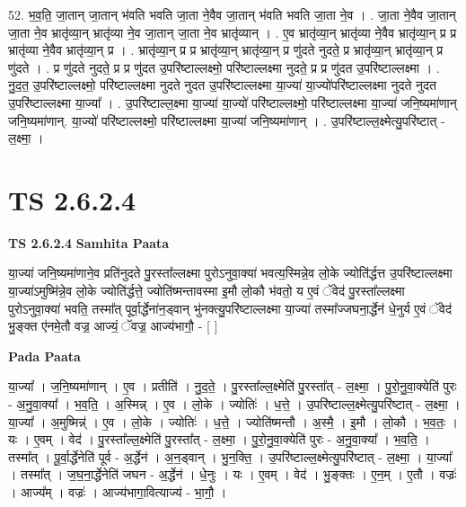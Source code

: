 \documentclass[17pt]{extarticle}
\begin{document}
52. भ॒व॒ति॒ जा॒तान् जा॒तान् भ॑वति भवति जा॒ता ने॒वैव जा॒तान् भ॑वति भवति जा॒ता ने॒व । . जा॒ता ने॒वैव जा॒तान् जा॒ता ने॒व भ्रातृ॑व्या॒न् भ्रातृ॑व्या ने॒व जा॒तान् जा॒ता ने॒व भ्रातृ॑व्यान् । . ए॒व भ्रातृ॑व्या॒न् भ्रातृ॑व्या ने॒वैव भ्रातृ॑व्या॒न् प्र प्र भ्रातृ॑व्या ने॒वैव भ्रातृ॑व्या॒न् प्र । . भ्रातृ॑व्या॒न् प्र प्र भ्रातृ॑व्या॒न् भ्रातृ॑व्या॒न् प्र णु॑दते नुदते॒ प्र भ्रातृ॑व्या॒न् भ्रातृ॑व्या॒न् प्र णु॑दते । . प्र णु॑दते नुदते॒ प्र प्र णु॑दत उ॒परि॑ष्टाल्लक्ष्मो॒ परि॑ष्टाल्लक्ष्मा नुदते॒ प्र प्र णु॑दत उ॒परि॑ष्टाल्लक्ष्मा । . नु॒द॒त॒ उ॒परि॑ष्टाल्लक्ष्मो॒ परि॑ष्टाल्लक्ष्मा नुदते नुदत उ॒परि॑ष्टाल्लक्ष्मा या॒ज्या॑ या॒ज्यो॑परि॑ष्टाल्लक्ष्मा नुदते नुदत उ॒परि॑ष्टाल्लक्ष्मा या॒ज्या᳚ । . उ॒परि॑ष्टाल्ल॒क्ष्मा या॒ज्या॑ या॒ज्यो॑ परि॑ष्टाल्लक्ष्मो॒ परि॑ष्टाल्लक्ष्मा या॒ज्या॑ जनि॒ष्यमा॑णान् जनि॒ष्यमा॑णान्. या॒ज्यो॑ परि॑ष्टाल्लक्ष्मो॒ परि॑ष्टाल्लक्ष्मा या॒ज्या॑ जनि॒ष्यमा॑णान् । . उ॒परि॑ष्टाल्ल॒क्ष्मेत्यु॒परि॑ष्टात् - ल॒क्ष्मा॒ । \newline
\pagebreak
{}

\section{ TS 2.6.2.4 }

\textbf{TS 2.6.2.4 } \newline
\textbf{Samhita Paata} \newline

या॒ज्या॑ जनि॒ष्यमा॑णाने॒व प्रति॑नुदते पु॒रस्ता᳚ल्लक्ष्मा पुरोऽनुवा॒क्या॑ भवत्य॒स्मिन्ने॒व लो॒के ज्योति॑र्द्धत्त उ॒परि॑ष्टाल्लक्ष्मा या॒ज्या॑ऽमुष्मि॑न्ने॒व लो॒के ज्योति॑र्द्धत्ते॒ ज्योति॑ष्मन्तावस्मा इ॒मौ लो॒कौ भ॑वतो॒ य ए॒वं ॅवेद॑ पु॒रस्ता᳚ल्लक्ष्मा पुरोऽनुवा॒क्या॑ भवति॒ तस्मा᳚त् पूर्वा॒र्द्धेना॑न॒ड्वान् भु॑नक्त्यु॒परि॑ष्टाल्लक्ष्मा या॒ज्या॑ तस्मा᳚ज्जघना॒र्द्धेन॑ धे॒नुर्य ए॒वं ॅवेद॑ भु॒ङ्क्त ए॑नमे॒तौ वज्र॒ आज्यं॒ ॅवज्र॒ आज्य॑भागौ॒ - [  ] \newline

\textbf{Pada Paata} \newline

या॒ज्या᳚ । ज॒नि॒ष्यमा॑णान् । ए॒व । प्रतीति॑ । नु॒द॒ते॒ । पु॒रस्ता᳚ल्ल॒क्ष्मेति॑ पु॒रस्ता᳚त् - ल॒क्ष्मा॒ । पु॒रो॒नु॒वा॒क्येति॑ पुरः - अ॒नु॒वा॒क्या᳚ । भ॒व॒ति॒ । अ॒स्मिन्न् । ए॒व । लो॒के । ज्योतिः॑ । ध॒त्ते॒ । उ॒परि॑ष्टाल्ल॒क्ष्मेत्यु॒परि॑ष्टात् - ल॒क्ष्मा॒ । या॒ज्या᳚ । अ॒मुष्मिन्न्॑ । ए॒व । लो॒के । ज्योतिः॑ । ध॒त्ते॒ । ज्योति॑ष्मन्तौ । अ॒स्मै॒ । इ॒मौ । लो॒कौ । भ॒व॒तः॒ । यः । ए॒वम् । वेद॑ । पु॒रस्ता᳚ल्ल॒क्ष्मेति॑ पु॒रस्ता᳚त् - ल॒क्ष्मा॒ । पु॒रो॒नु॒वा॒क्येति॑ पुरः - अ॒नु॒वा॒क्या᳚ । भ॒व॒ति॒ । तस्मा᳚त् । पू॒र्वा॒र्द्धेनेति॑ पूर्व - अ॒र्द्धेन॑ । अ॒न॒ड्वान् । भु॒न॒क्ति॒ । उ॒परि॑ष्टाल्ल॒क्ष्मेत्यु॒परि॑ष्टात् - ल॒क्ष्मा॒ । या॒ज्या᳚ । तस्मा᳚त् । ज॒घ॒ना॒र्द्धेनेति॑ जघन - अ॒र्द्धेन॑ । धे॒नुः । यः । ए॒वम् । वेद॑ । भु॒ङ्क्तः । ए॒न॒म् । ए॒तौ । वज्रः॑ । आज्य᳚म् । वज्रः॑ । आज्य॑भागा॒वित्याज्य॑ - भा॒गौ॒ ।  \newline
\end{document}
